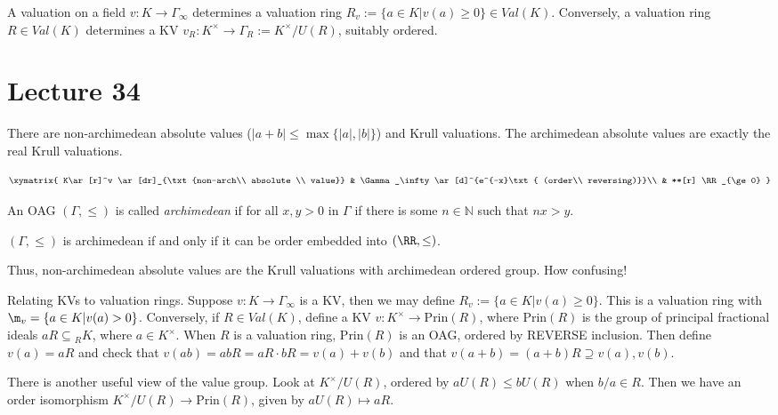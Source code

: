  \begin{theorem}
   A valuation on a field $v:K\to \Gamma_\infty$ determines a valuation ring $R_v:=
   \{a\in K|v(a)\ge 0\}\in Val(K)$. Conversely, a valuation ring $R\in Val(K)$ determines
   a KV $v_R:K^\times \to \Gamma_R:=K^\times /U(R)$, suitably ordered.
 \end{theorem}
 \setcounter{lecture}{34}
 \section{Lecture 34}

 There are non-archimedean absolute values ($|a+b|\le \max\{|a|,|b|\}$) and Krull
 valuations. The archimedean absolute values are exactly the real Krull valuations.

 \[\xymatrix{
 K\ar[r]^v \ar[dr]_{\txt{non-arch\\ absolute \\ value}} & \Gamma_\infty \ar[d]^{e^{-x}\txt{ (order\\ reversing)}}\\
  & **[r] \RR_{\ge 0}
 }\]

 An OAG $(\Gamma,\le)$ is called \emph{archimedean} if for all $x,y>0$ in
 $\Gamma$ if there is some $n\in \mathbb{N}$ such that $nx>y$.

 \begin{theorem}[H\"older, 1901]
   $(\Gamma,\le)$ is archimedean if and only if it can be order embedded into
   $(\RR,\le)$.
 \end{theorem}
 Thus, non-archimedean absolute values are the Krull valuations with archimedean ordered
 group. How confusing!

 Relating KVs to valuation rings. Suppose $v:K\to \Gamma_\infty$ is a KV, then we may
 define $R_v:=\{a\in K| v(a)\ge 0\}$. This is a valuation ring with $\m_v=\{a\in
 K|v(a)>0\}$. Conversely, if $R\in Val(K)$, define a KV $v:K^\times \to \text{Prin}(R)$,
 where $\text{Prin}(R)$ is the group of principal fractional ideals $aR\subseteq {}_R K$,
 where $a\in K^\times$. When $R$ is a valuation ring, $\text{Prin}(R)$ is an OAG, ordered
 by REVERSE inclusion. Then define $v(a)=aR$ and check that $v(ab)=abR=aR\cdot
 bR=v(a)+v(b)$ and that $v(a+b)=(a+b)R \supseteq v(a), v(b)$.

 There is another useful view of the value group. Look at $K^\times /U(R)$, ordered by
 $aU(R)\le bU(R)$ when $b/a\in R$. Then we have an order isomorphism $K^\times/U(R)\to
 \text{Prin}(R)$, given by $aU(R)\mapsto aR$.

